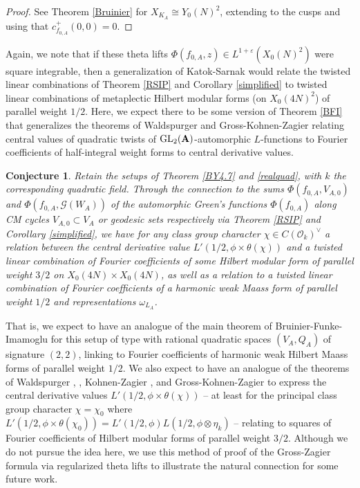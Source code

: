 \documentclass{amsart}
\newtheorem{conjecture}[theorem]{Conjecture}
\theoremstyle{definition}
\theoremstyle{definition}
\theoremstyle{definition}
\begin{document}
\begin{proof} See Theorem \ref{Bruinier} for $X_{K_A} \cong Y_0(N)^2$, extending to the cusps and using that $c_{f_{0, A}}^+(0,0)=0$. \end{proof}

Again, we note that if these theta lifts $\Phi(f_{0,A}, z) \in L^{1 + \varepsilon}(X_0(N)^2)$ were square integrable, 
then a generalization of Katok-Sarnak \cite{KaSa} would relate the twisted linear combinations of 
Theorem \ref{RSIP} and Corollary \ref{simplified} to twisted linear combinations of metaplectic Hilbert modular forms (on $X_0(4N)^2$) of parallel 
weight $1/2$. Here, we expect there to be some version of Theorem \ref{BFI} that generalizes the theorems of Waldspurger \cite{Wa-de} and Gross-Kohnen-Zagier 
\cite[$\S$II.4, Corollary 1]{GKZ} relating central values of quadratic twists of $\operatorname{GL}_2({\bf{A}})$-automorphic $L$-functions to Fourier coefficients
of half-integral weight forms to central derivative values. 

\begin{conjecture} Retain the setups of Theorem \ref{BY4.7} and \ref{realquad}, with $k$ the corresponding quadratic field.
Through the connection to the sums $\Phi(f_{0, A}, V_{A, 0})$ and $\Phi(f_{0, A}, \mathcal{G}(W_A))$ of the automorphic Green's functions
$\Phi(f_{0, A})$ along CM cycles $V_{A, 0} \subset V_A$ or geodesic sets respectively via Theorem \ref{RSIP} and Corollary \ref{simplified}, 
we have for any class group character $\chi \in C(\mathcal{O}_k)^{\vee}$ a relation between the central derivative value $L'(1/2, \phi \times \theta(\chi))$ 
and a twisted linear combination of Fourier coefficients of some Hilbert modular form of parallel weight $3/2$ on $X_0(4N) \times X_0(4N)$,
as well as a relation to a twisted linear combination of Fourier coefficients of a harmonic weak Maass form of parallel weight $1/2$ and representations $\omega_{L_A}$.

\end{conjecture}\label{metatrace2}

That is, we expect to have an analogue of the main theorem of Bruinier-Funke-Imamoglu \cite{BFI} for this setup of type with
rational quadratic spaces $(V_A, Q_A)$ of signature $(2,2)$, linking to Fourier coefficients of harmonic weak Hilbert Maass forms of parallel weight $1/2$.
We also expect to have an analogue of the theorems of Waldspurger \cite{Wa-de}, \cite{Wa-CdS}, Kohnen-Zagier \cite{KZ}, 
and Gross-Kohnen-Zagier \cite[$\S$ II.4, Corollary 1]{GKZ} to express the central derivative values $L'(1/2, \phi \times \theta(\chi))$ -- at least for the principal
class group character $\chi = \chi_0$ where $L'(1/2, \phi \times \theta(\chi_0)) = L'(1/2, \phi) L(1/2, \phi \otimes \eta_k)$ -- relating to squares of Fourier 
coefficients of Hilbert modular forms of parallel weight $3/2$. Although we do not pursue the idea here, we use this method of proof of the Gross-Zagier 
formula via regularized theta lifts to illustrate the natural connection for some future work. 
\end{document}
